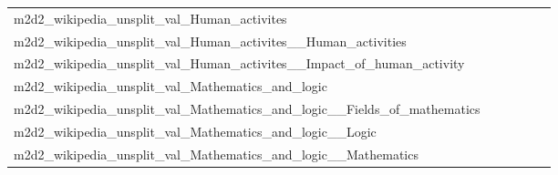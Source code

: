 {\begin{longtable}{m{6cm}m{1.7cm}m{1.7cm}m{1.7cm}m{1.7cm}m{1.7cm}}
	m2d2\_wikipedia\_unsplit\_val\_Human\_activites  & \colorbox[HTML]{fefee2}{\makebox[\mywidth][c]{12.43}} & \colorbox[HTML]{e9f6af}{\makebox[\mywidth][c]{12.03}} & \colorbox[HTML]{ffffe5}{\makebox[\mywidth][c]{12.98}} & \colorbox[HTML]{d1ec9f}{\makebox[\mywidth][c]{11.95}} & \colorbox[HTML]{77c578}{\makebox[\mywidth][c]{11.81}}\\
	m2d2\_wikipedia\_unsplit\_val\_Human\_activites\_\_Human\_activities  & \colorbox[HTML]{fefee2}{\makebox[\mywidth][c]{12.43}} & \colorbox[HTML]{e9f6af}{\makebox[\mywidth][c]{12.03}} & \colorbox[HTML]{ffffe5}{\makebox[\mywidth][c]{12.98}} & \colorbox[HTML]{d1ec9f}{\makebox[\mywidth][c]{11.95}} & \colorbox[HTML]{77c578}{\makebox[\mywidth][c]{11.81}}\\
	m2d2\_wikipedia\_unsplit\_val\_Human\_activites\_\_Impact\_of\_human\_activity  & \colorbox[HTML]{fefee0}{\makebox[\mywidth][c]{12.47}} & \colorbox[HTML]{e8f6ae}{\makebox[\mywidth][c]{12.05}} & \colorbox[HTML]{ffffe5}{\makebox[\mywidth][c]{13.12}} & \colorbox[HTML]{dcf1a5}{\makebox[\mywidth][c]{12.00}} & \colorbox[HTML]{77c578}{\makebox[\mywidth][c]{11.82}}\\
	m2d2\_wikipedia\_unsplit\_val\_Mathematics\_and\_logic  & \colorbox[HTML]{fcfed8}{\makebox[\mywidth][c]{12.90}} & \colorbox[HTML]{e0f2a8}{\makebox[\mywidth][c]{12.51}} & \colorbox[HTML]{ffffe5}{\makebox[\mywidth][c]{13.79}} & \colorbox[HTML]{d8efa2}{\makebox[\mywidth][c]{12.48}} & \colorbox[HTML]{77c578}{\makebox[\mywidth][c]{12.29}}\\
	m2d2\_wikipedia\_unsplit\_val\_Mathematics\_and\_logic\_\_Fields\_of\_mathematics  & \colorbox[HTML]{dbf1a4}{\makebox[\mywidth][c]{8.24}} & \colorbox[HTML]{e0f2a8}{\makebox[\mywidth][c]{8.26}} & \colorbox[HTML]{ffffe5}{\makebox[\mywidth][c]{9.37}} & \colorbox[HTML]{e5f4ab}{\makebox[\mywidth][c]{8.28}} & \colorbox[HTML]{77c578}{\makebox[\mywidth][c]{8.06}}\\
	m2d2\_wikipedia\_unsplit\_val\_Mathematics\_and\_logic\_\_Logic  & \colorbox[HTML]{fdfedb}{\makebox[\mywidth][c]{13.21}} & \colorbox[HTML]{e3f4aa}{\makebox[\mywidth][c]{12.87}} & \colorbox[HTML]{ffffe5}{\makebox[\mywidth][c]{13.90}} & \colorbox[HTML]{def2a6}{\makebox[\mywidth][c]{12.85}} & \colorbox[HTML]{77c578}{\makebox[\mywidth][c]{12.67}}\\
	m2d2\_wikipedia\_unsplit\_val\_Mathematics\_and\_logic\_\_Mathematics  & \colorbox[HTML]{fcfed8}{\makebox[\mywidth][c]{12.90}} & \colorbox[HTML]{e0f2a8}{\makebox[\mywidth][c]{12.51}} & \colorbox[HTML]{ffffe5}{\makebox[\mywidth][c]{13.79}} & \colorbox[HTML]{d8efa2}{\makebox[\mywidth][c]{12.48}} & \colorbox[HTML]{77c578}{\makebox[\mywidth][c]{12.29}}\\

\end{longtable}}

